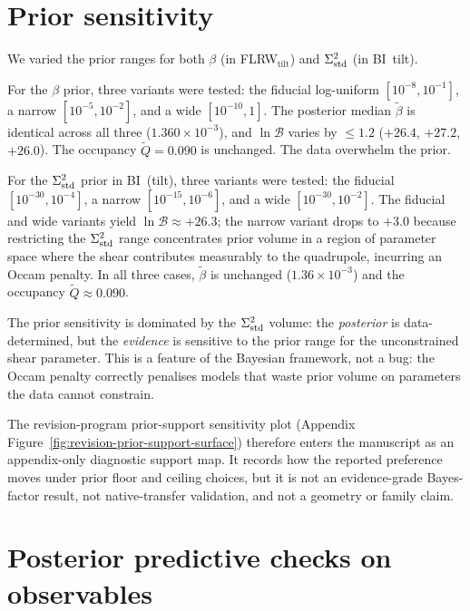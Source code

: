 \section{Prior sensitivity}\label{sec:prior-robust}

We varied the prior ranges for both $\beta$ (in
FLRW$_\mathrm{tilt}$) and $\Sigma^2_{\mathrm{std}}$ (in BI~tilt).

For the $\beta$ prior, three variants were tested: the
fiducial log-uniform $[10^{-8}, 10^{-1}]$, a narrow
$[10^{-5}, 10^{-2}]$, and a wide $[10^{-10}, 1]$.  The
posterior median $\tilde{\beta}$ is identical across all three
($1.360 \times 10^{-3}$), and $\ln\mathcal{B}$ varies by
$\leq 1.2$ ($+26.4$, $+27.2$, $+26.0$).
The occupancy $\tilde{Q} = 0.090$ is unchanged.  The data
overwhelm the prior.

For the $\Sigma^2_{\mathrm{std}}$ prior in BI~(tilt), three variants were
tested: the fiducial $[10^{-30}, 10^{-4}]$, a narrow
$[10^{-15}, 10^{-6}]$, and a wide $[10^{-30}, 10^{-2}]$.  The
fiducial and wide variants yield $\ln\mathcal{B} \approx +26.3$;
the narrow variant drops to $+3.0$ because restricting the
$\Sigma^2_{\mathrm{std}}$ range concentrates prior volume in a region of
parameter space where the shear contributes measurably to the
quadrupole, incurring an Occam penalty.  In all three cases,
$\tilde{\beta}$ is unchanged ($1.36 \times 10^{-3}$) and the
occupancy $\tilde{Q} \approx 0.090$.

The prior sensitivity is dominated by the $\Sigma^2_{\mathrm{std}}$ volume:
the \emph{posterior} is data-determined, but the
\emph{evidence} is sensitive to the prior range for the
unconstrained shear parameter.  This is a feature of the
Bayesian framework, not a bug: the Occam penalty correctly
penalises models that waste prior volume on parameters the data
cannot constrain.

The revision-program prior-support sensitivity plot
(Appendix Figure~\ref{fig:revision-prior-support-surface}) therefore
enters the manuscript as an appendix-only diagnostic support map.  It
records how the reported preference moves under prior floor and ceiling
choices, but it is not an evidence-grade Bayes-factor result, not
native-transfer validation, and not a geometry or family claim.


\section{Posterior predictive checks on observables}
\label{sec:ppc-robust}

